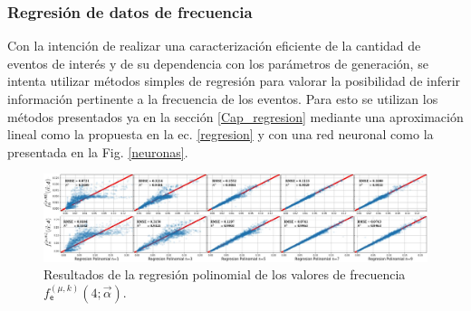 


\subsubsection{Regresión de datos de frecuencia}

Con la intención de realizar una caracterización eficiente de la cantidad de eventos de interés y de su dependencia con los parámetros de generación, se intenta utilizar métodos simples de regresión para valorar la posibilidad de inferir información pertinente a la frecuencia de los eventos. Para esto se utilizan los métodos presentados ya en la sección \ref{Cap_regresion} mediante una aproximación lineal como la propuesta en la ec. \ref{regresion} y con una red neuronal como la presentada en la Fig. \ref{neuronas}.

\begin{figure}[!ht]
\centering
\includegraphics[width=1\textwidth]{Cap4/imagenes/ML_Entries3.png}
\caption{Resultados de la regresión polinomial de los valores de frecuencia $f^{(\mu, k)}_\textsf{e} (4;\vec{\alpha})$.}
\label{regresionALL}
\end{figure}


